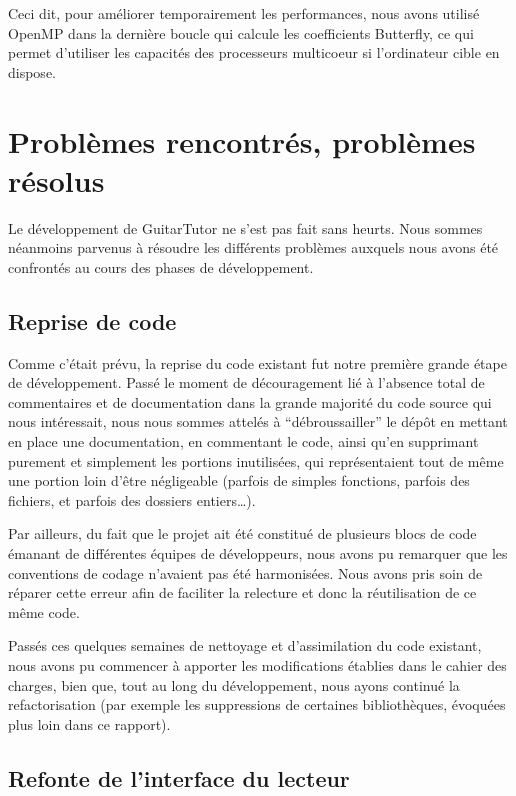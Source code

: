 \documentclass[a4paper,11pt]{article}
\begin{document}
Ceci dit, pour améliorer temporairement les performances, nous avons utilisé OpenMP dans la dernière boucle qui calcule
les coefficients Butterfly, ce qui permet d'utiliser les capacités des processeurs multicoeur si l'ordinateur cible en dispose.
\clearpage




\section{Problèmes rencontrés, problèmes résolus}

Le développement de GuitarTutor ne s'est pas fait sans heurts. Nous sommes néanmoins parvenus à résoudre les différents problèmes auxquels nous avons été confrontés au cours des phases de développement.

\subsection{Reprise de code}

Comme c'était prévu, la reprise du code existant fut notre première grande étape de développement. Passé le moment de découragement lié à l'absence total de commentaires et de documentation dans la grande majorité du code source qui nous intéressait, nous nous sommes attelés à ``débroussailler'' le dépôt en mettant en place une documentation, en commentant le code, ainsi qu'en supprimant purement et simplement les portions inutilisées, qui représentaient tout de même une portion loin d'être négligeable (parfois de simples fonctions, parfois des fichiers, et parfois des dossiers entiers\dots).

Par ailleurs, du fait que le projet ait été constitué de plusieurs blocs de code émanant de différentes équipes de développeurs, nous avons pu remarquer que les conventions de codage n'avaient pas été harmonisées. Nous avons pris soin de réparer cette erreur afin de faciliter la relecture et donc la réutilisation de ce même code.

Passés ces quelques semaines de nettoyage et d'assimilation du code existant, nous avons pu commencer à apporter les modifications établies dans le cahier des charges, bien que, tout au long du développement, nous ayons continué la refactorisation (par exemple les suppressions de certaines bibliothèques, évoquées plus loin dans ce rapport).

\subsection{Refonte de l'interface du lecteur}
\end{document}
